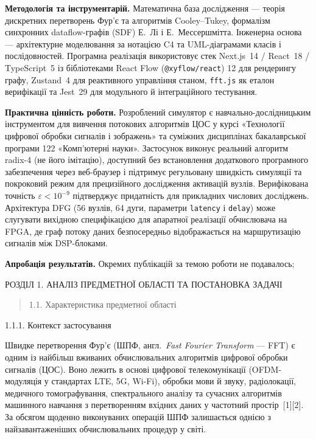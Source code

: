 \textbf{Методологія та інструментарій.} Математична база дослідження ---
теорія дискретних перетворень Фур'є та алгоритмів Cooley--Tukey,
формалізм синхронних dataflow-графів (SDF) Е.~Лі і Е.~Мессершмітта.
Інженерна основа --- архітектурне моделювання за нотацією C4 та
UML-діаграмами класів і послідовностей. Програмна реалізація
використовує стек Next.js~14 / React~18 / TypeScript~5 із бібліотеками
React Flow (\texttt{@xyflow/react}) 12 для рендерингу графу, Zustand~4
для реактивного управління станом, \texttt{fft.js} як еталон верифікації
та Jest~29 для модульного й інтеграційного тестування.

\textbf{Практична цінність роботи.} Розроблений симулятор є
навчально-дослідницьким інструментом для вивчення потокових алгоритмів
ЦОС у курсі «Технології цифрової обробки сигналів і зображень» та
суміжних дисциплінах бакалаврської програми 122 «Комп'ютерні науки».
Застосунок виконує реальний алгоритм radix-4 (не його імітацію),
доступний без встановлення додаткового програмного забезпечення через
веб-браузер і підтримує регульовану швидкість симуляції та покроковий
режим для прецизійного дослідження активацій вузлів. Верифікована
точність \(\varepsilon < 10^{- 9}\) підтверджує придатність для
прикладних числових досліджень. Архітектура DFG (56 вузлів, 64 дуги,
параметри \texttt{latency} і \texttt{delay}) може слугувати вихідною
специфікацією для апаратної реалізації обчислювача на FPGA, де граф
потоку даних безпосередньо відображається на маршрутизацію сигналів між
DSP-блоками.

\textbf{Апробація результатів.} Окремих публікацій за темою роботи не
подавалось;

\protect{}\label{_Toc229682904}{}РОЗДІЛ 1. АНАЛІЗ
ПРЕДМЕТНОЇ ОБЛАСТІ ТА ПОСТАНОВКА ЗАДАЧІ

\begin{quote}
\protect{}\label{_Toc229682905}{}1.1. Характеристика
предметної області
\end{quote}

1.1.1. Контекст застосування

Швидке перетворення Фур'є (ШПФ, англ.~\emph{Fast Fourier Transform} ---
FFT) є одним із найбільш вживаних обчислювальних алгоритмів цифрової
обробки сигналів (ЦОС). Воно лежить в основі цифрової телекомунікації
(OFDM-модуляція у стандартах LTE, 5G, Wi-Fi), обробки мови й звуку,
радіолокації, медичного томографування, спектрального аналізу та
сучасних алгоритмів машинного навчання з перетворенням вхідних даних у
частотний простір~{[}1{]}{[}2{]}. За обсягом щоденно виконуваних
операцій ШПФ залишається однією з найзавантаженіших обчислювальних
процедур у світі.

